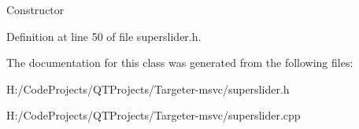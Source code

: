 Constructor 

Definition at line 50 of file superslider.\+h.



The documentation for this class was generated from the following files\+:\begin{DoxyCompactItemize}
\item 
H\+:/\+Code\+Projects/\+Q\+T\+Projects/\+Targeter-\/msvc/superslider.\+h\item 
H\+:/\+Code\+Projects/\+Q\+T\+Projects/\+Targeter-\/msvc/superslider.\+cpp\end{DoxyCompactItemize}
